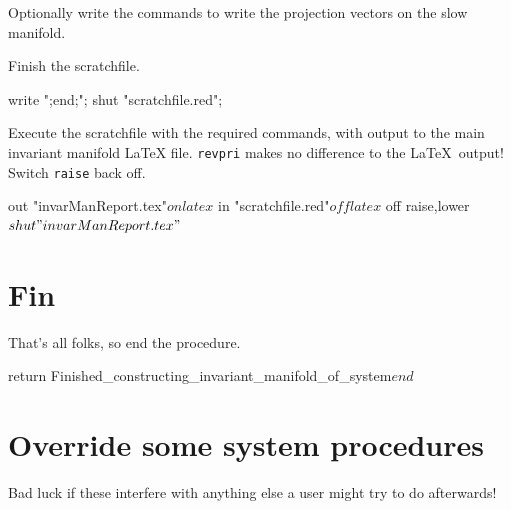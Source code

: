 \documentclass[11pt,a5paper]{article}
\begin{document}
Optionally write the commands to write the projection
vectors on the slow manifold.

Finish the scratchfile.
\begin{reduce}
write ";end;";
shut "scratchfile.red";
\end{reduce}

Execute the scratchfile with the required commands, with
output to the main invariant manifold LaTeX file.
\verb|revpri| makes no difference to the \LaTeX\ output!
Switch \verb|raise| back off.
\begin{reduce}
out "invarManReport.tex"$
on latex$
in "scratchfile.red"$
off latex$ off raise,lower$
shut "invarManReport.tex"$
\end{reduce}






\section{Fin}
\label{secFin}
That's all folks, so end the procedure. 
\begin{reduce}
return Finished_constructing_invariant_manifold_of_system$ 
end$
\end{reduce}






\section{Override some system procedures}
Bad luck if these interfere with anything else a user might
try to do afterwards!
\end{document}
